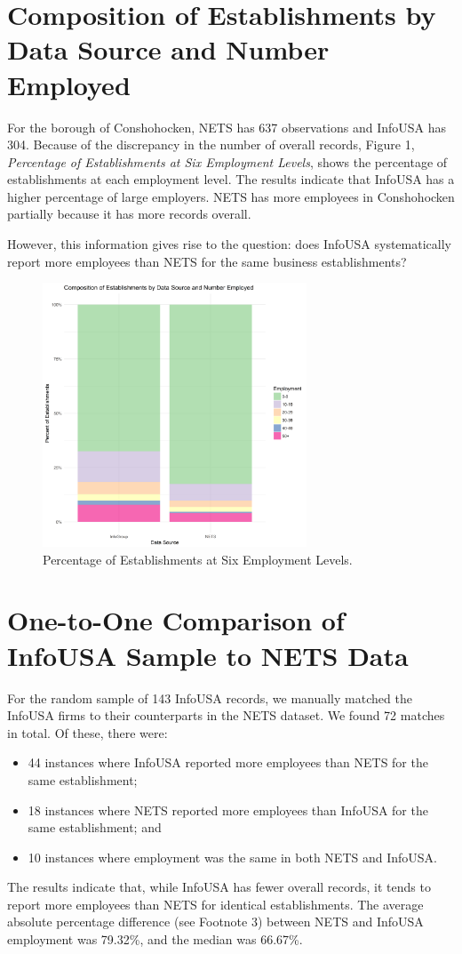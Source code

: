 \documentclass[paper = letter, fontsize = 11pt]{scrartcl}
\begin{document}
\section{Composition of Establishments by Data Source and Number Employed}
For the borough of Conshohocken, NETS has 637 observations and InfoUSA has 304. Because of the discrepancy in the number of overall records, Figure 1, \textit{Percentage of Establishments at Six Employment Levels}, shows the percentage of establishments at each employment level. The results indicate that InfoUSA has a higher percentage of large employers. NETS has more employees in Conshohocken partially because it has more records overall.\par
However, this information gives rise to the question: does InfoUSA systematically report more employees than NETS for the same business establishments?
\begin{figure}[h]
	\centering
	\includegraphics[width = 0.7\textwidth]{employmentComposition}
	\caption{Percentage of Establishments at Six Employment Levels.}
\end{figure}
\section{One-to-One Comparison of InfoUSA Sample to NETS Data}
For the random sample of 143 InfoUSA records, we manually matched the InfoUSA firms to their counterparts in the NETS dataset. We found 72 matches in total. Of these, there were:
\begin{itemize}
	\item 44 instances where InfoUSA reported more employees than NETS for the same establishment;
	\item 18 instances where NETS reported more employees than InfoUSA for the same establishment; and
	\item 10 instances where employment was the same in both NETS and InfoUSA.
\end{itemize}
The results indicate that, while InfoUSA has fewer overall records, it tends to report more employees than NETS for identical establishments. The average absolute percentage difference (see Footnote 3) between NETS and InfoUSA employment was 79.32\%, and the median was 66.67\%.
\end{document}
